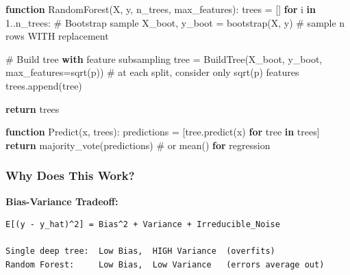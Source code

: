 \documentclass[11pt]{article}
\newenvironment{Shaded}{\begin{snugshade}}{\end{snugshade}}
\newcommand{\AttributeTok}[1]{\textcolor[rgb]{0.16,0.50,0.73}{#1}}
\newcommand{\ControlFlowTok}[1]{\textcolor[rgb]{0.99,0.74,0.29}{\textbf{#1}}}
\newcommand{\FloatTok}[1]{\textcolor[rgb]{0.96,0.45,0.00}{#1}}
\newcommand{\FunctionTok}[1]{\textcolor[rgb]{0.56,0.27,0.68}{#1}}
\newcommand{\KeywordTok}[1]{\textcolor[rgb]{0.81,0.81,0.76}{\textbf{#1}}}
\newcommand{\NormalTok}[1]{\textcolor[rgb]{0.81,0.81,0.76}{#1}}
\newcommand{\OperatorTok}[1]{\textcolor[rgb]{0.81,0.81,0.76}{#1}}
\begin{document}
\begin{Shaded}
\begin{Highlighting}[]
\KeywordTok{function} \FunctionTok{RandomForest}\NormalTok{(X}\OperatorTok{,}\NormalTok{ y}\OperatorTok{,}\NormalTok{ n\_trees}\OperatorTok{,}\NormalTok{ max\_features)}\OperatorTok{:}
\NormalTok{    trees }\OperatorTok{=}\NormalTok{ []}
    \ControlFlowTok{for}\NormalTok{ i }\KeywordTok{in} \FloatTok{1.}\OperatorTok{.}\AttributeTok{n\_trees}\OperatorTok{:}
\NormalTok{        \# Bootstrap sample}
\NormalTok{        X\_boot}\OperatorTok{,}\NormalTok{ y\_boot }\OperatorTok{=} \FunctionTok{bootstrap}\NormalTok{(X}\OperatorTok{,}\NormalTok{ y)          \# sample n rows WITH replacement}
        
\NormalTok{        \# Build tree }\ControlFlowTok{with}\NormalTok{ feature subsampling}
\NormalTok{        tree }\OperatorTok{=} \FunctionTok{BuildTree}\NormalTok{(X\_boot}\OperatorTok{,}\NormalTok{ y\_boot}\OperatorTok{,}
\NormalTok{                         max\_features}\OperatorTok{=}\FunctionTok{sqrt}\NormalTok{(p))     \# at each split}\OperatorTok{,}\NormalTok{ consider only }\FunctionTok{sqrt}\NormalTok{(p) features}
\NormalTok{        trees}\OperatorTok{.}\FunctionTok{append}\NormalTok{(tree)}
    
    \ControlFlowTok{return}\NormalTok{ trees}

\KeywordTok{function} \FunctionTok{Predict}\NormalTok{(x}\OperatorTok{,}\NormalTok{ trees)}\OperatorTok{:}
\NormalTok{    predictions }\OperatorTok{=}\NormalTok{ [tree}\OperatorTok{.}\FunctionTok{predict}\NormalTok{(x) }\ControlFlowTok{for}\NormalTok{ tree }\KeywordTok{in}\NormalTok{ trees]}
    \ControlFlowTok{return} \FunctionTok{majority\_vote}\NormalTok{(predictions)              \# or }\FunctionTok{mean}\NormalTok{() }\ControlFlowTok{for}\NormalTok{ regression}
\end{Highlighting}
\end{Shaded}

\subsubsection{Why Does This Work?}\label{why-does-this-work}

\textbf{Bias-Variance Tradeoff:}

\setcodelang{}

\begin{verbatim}
E[(y - y_hat)^2] = Bias^2 + Variance + Irreducible_Noise

Single deep tree:  Low Bias,  HIGH Variance  (overfits)
Random Forest:     Low Bias,  Low Variance   (errors average out)
\end{verbatim}
\end{document}
